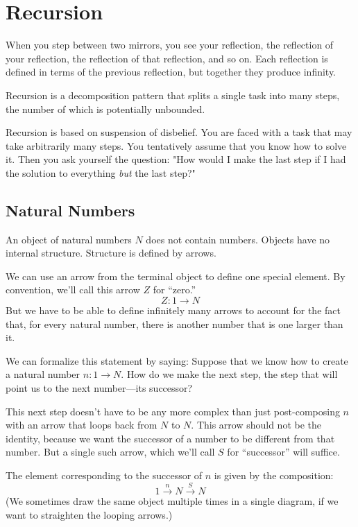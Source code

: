 \documentclass[DaoFP]{subfiles}
\begin{document}
\setcounter{chapter}{6}

\chapter{Recursion}

When you step between two mirrors, you see your reflection, the reflection of your reflection, the reflection of that reflection, and so on. Each reflection is defined in terms of the previous reflection, but together they produce infinity.

Recursion is a decomposition pattern that splits a single task into many steps, the number of which is potentially unbounded.  

Recursion is based on suspension of disbelief. You are faced with a task that may take arbitrarily many steps. You tentatively assume that you know how to solve it. Then you ask yourself the question: "How would I make the last step if I had the solution to everything \emph{but} the last step?"

\section{Natural Numbers}

An object of natural numbers $N$ does not contain numbers. Objects have no internal structure. Structure is defined by arrows. 

We can use an arrow from the terminal object to define one special element. By convention, we'll call this arrow $Z$ for ``zero.''
\[ Z \colon 1 \to N \]
But we have to be able to define infinitely many arrows to account for the fact that, for every natural number, there is another number that is one larger than it. 

We can formalize this statement by saying: Suppose that we know how to create a natural number $n \colon 1 \to N$. How do we make the next step, the step that will point us to the next number---its successor? 

This next step doesn't have to be any more complex than just post-composing $n$ with an arrow that loops back from $N$ to $N$. This arrow should not be the identity, because we want the successor of a number to be different from that number. But a single such arrow, which we'll call $S$  for ``successor'' will suffice. 

The element corresponding to the successor of $n$ is given by the composition:
\[ 1 \xrightarrow{n} N \xrightarrow{S} N\]
(We sometimes draw the same object multiple times in a single diagram, if we want to straighten the looping arrows.)
\end{document}
